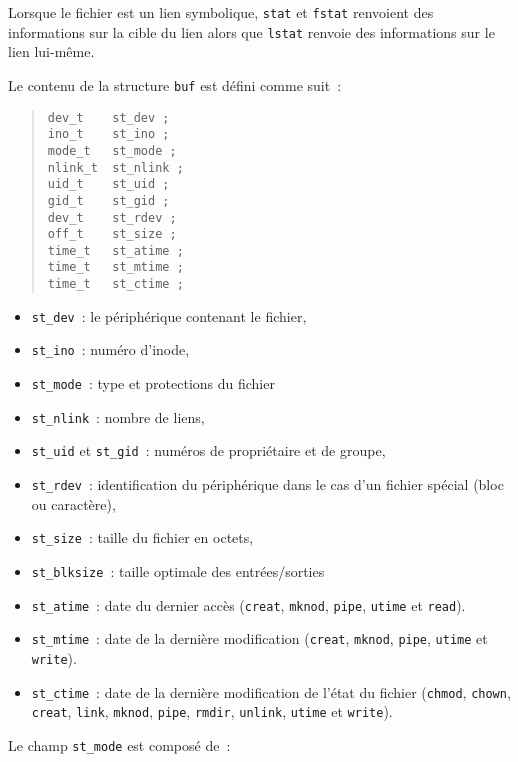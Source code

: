 \documentclass [twoside] {report}
\begin{document}
Lorsque le fichier est un lien symbolique, \texttt {stat} et \texttt {fstat}
renvoient des informations sur la cible du lien alors que \texttt {lstat}
renvoie des informations sur le lien lui-même.

Le contenu de la structure \texttt {buf} est défini
comme suit~:

\begin {quote}
\begin {verbatim}
dev_t    st_dev ;
ino_t    st_ino ;
mode_t   st_mode ;
nlink_t  st_nlink ;
uid_t    st_uid ;
gid_t    st_gid ;
dev_t    st_rdev ;
off_t    st_size ;
time_t   st_atime ;
time_t   st_mtime ;
time_t   st_ctime ;
\end{verbatim}
\end {quote}

\begin {itemize}
    \item \texttt {st\_dev}~: le périphérique contenant le fichier,
    \item \texttt {st\_ino}~: numéro d'inode,
    \item \texttt {st\_mode}~: type et protections du fichier
    \item \texttt {st\_nlink}~: nombre de liens,
    \item \texttt {st\_uid} et \texttt {st\_gid}~: numéros de propriétaire et de groupe,
    \item \texttt {st\_rdev}~: identification du périphérique dans le cas
	d'un fichier spécial (bloc ou caractère),
    \item \texttt {st\_size}~: taille du fichier en octets,
    \item \texttt {st\_blksize}~: taille optimale des entrées/sorties
    \item \texttt {st\_atime}~: date du dernier accès (\texttt {creat},
	\texttt {mknod}, \texttt {pipe}, \texttt {utime} et \texttt {read}).
    \item \texttt {st\_mtime}~: date de la dernière modification
	(\texttt {creat}, \texttt {mknod}, \texttt {pipe}, \texttt {utime} et \texttt {write}).
    \item \texttt {st\_ctime}~: date de la dernière modification
	de l'état du fichier (\texttt {chmod}, \texttt {chown}, \texttt {creat},
	\texttt {link}, \texttt {mknod}, \texttt {pipe}, \texttt {rmdir}, \texttt {unlink},
	\texttt {utime} et \texttt {write}).
\end {itemize}

Le champ \texttt {st\_mode} est composé de~:
\end{document}
